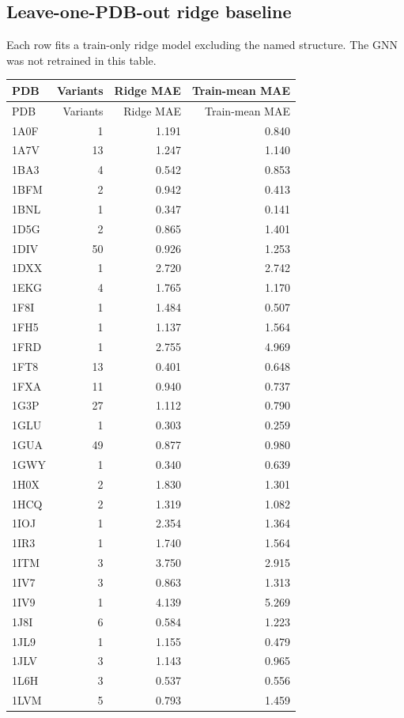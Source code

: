 \documentclass[11pt]{article}
\begin{document}
\subsection{Leave-one-PDB-out ridge baseline}
Each row fits a train-only ridge model excluding the named structure. The GNN was not retrained in this table.\
\begin{longtable}{lrrr}\hline PDB & Variants & Ridge MAE & Train-mean MAE\\\hline\endfirsthead\hline PDB & Variants & Ridge MAE & Train-mean MAE\\\hline\endhead
1A0F & 1 & 1.191 & 0.840\\
1A7V & 13 & 1.247 & 1.140\\
1BA3 & 4 & 0.542 & 0.853\\
1BFM & 2 & 0.942 & 0.413\\
1BNL & 1 & 0.347 & 0.141\\
1D5G & 2 & 0.865 & 1.401\\
1DIV & 50 & 0.926 & 1.253\\
1DXX & 1 & 2.720 & 2.742\\
1EKG & 4 & 1.765 & 1.170\\
1F8I & 1 & 1.484 & 0.507\\
1FH5 & 1 & 1.137 & 1.564\\
1FRD & 1 & 2.755 & 4.969\\
1FT8 & 13 & 0.401 & 0.648\\
1FXA & 11 & 0.940 & 0.737\\
1G3P & 27 & 1.112 & 0.790\\
1GLU & 1 & 0.303 & 0.259\\
1GUA & 49 & 0.877 & 0.980\\
1GWY & 1 & 0.340 & 0.639\\
1H0X & 2 & 1.830 & 1.301\\
1HCQ & 2 & 1.319 & 1.082\\
1IOJ & 1 & 2.354 & 1.364\\
1IR3 & 1 & 1.740 & 1.564\\
1ITM & 3 & 3.750 & 2.915\\
1IV7 & 3 & 0.863 & 1.313\\
1IV9 & 1 & 4.139 & 5.269\\
1J8I & 6 & 0.584 & 1.223\\
1JL9 & 1 & 1.155 & 0.479\\
1JLV & 3 & 1.143 & 0.965\\
1L6H & 3 & 0.537 & 0.556\\
1LVM & 5 & 0.793 & 1.459\\

\end{longtable}
\end{document}
